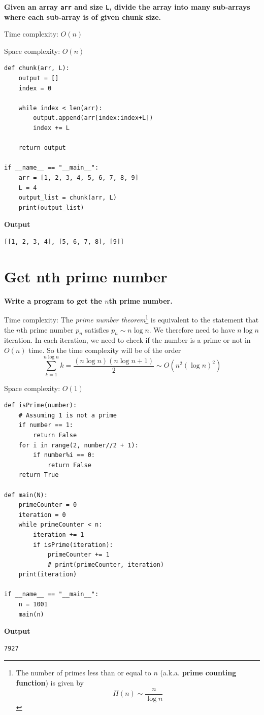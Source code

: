 \documentclass[a4paper,11pt]{book}
\begin{document}
\textbf{Given an array \lstinline{arr} and size \lstinline{L}, divide the array into many sub-arrays where each sub-array is of given chunk size. }
\vspace{5mm}

\noindent Time complexity:  $O(n)$

\noindent Space complexity: $O(n)$

\begin{lstlisting}
def chunk(arr, L):
    output = []
    index = 0

    while index < len(arr):
        output.append(arr[index:index+L])
        index += L
    
    return output

if __name__ == "__main__":
    arr = [1, 2, 3, 4, 5, 6, 7, 8, 9]
    L = 4
    output_list = chunk(arr, L)
    print(output_list)
\end{lstlisting}
\textbf{Output}
\begin{lstlisting}
[[1, 2, 3, 4], [5, 6, 7, 8], [9]]
\end{lstlisting}

\newpage
\section{Get nth prime number}

\textbf{Write a program to get the $n$th prime number.}
\vspace{5mm}

\noindent Time complexity: The \textit{prime number theorem}\footnote{The number of primes less than or equal to $n$ (a.k.a. \textbf{prime counting function}) is given by $$\Pi(n) \sim \dfrac{n}{\log n}$$} is equivalent to the statement that the $n$th prime number $p_n$ satisfies $p_n \sim n\log n$.  We therefore need to have $n\log n$ iteration. In each iteration, we need to check if the number is a prime or not in $O(n)$ time. So the time complexity will be of the order
$$\sum_{k=1}^{n\log n} k = \dfrac{(n\log n)(n\log n + 1)}{2} \sim O(n^2(\log n)^2)$$

\noindent Space complexity: $O(1)$

\begin{lstlisting}
def isPrime(number):
    # Assuming 1 is not a prime
    if number == 1:
        return False
    for i in range(2, number//2 + 1):
        if number%i == 0:
            return False
    return True

def main(N):
    primeCounter = 0
    iteration = 0
    while primeCounter < n:
        iteration += 1
        if isPrime(iteration):
            primeCounter += 1
            # print(primeCounter, iteration)
    print(iteration)

if __name__ == "__main__":
    n = 1001
    main(n)
\end{lstlisting}
\textbf{Output}
\begin{lstlisting}
7927
\end{lstlisting}
\end{document}
